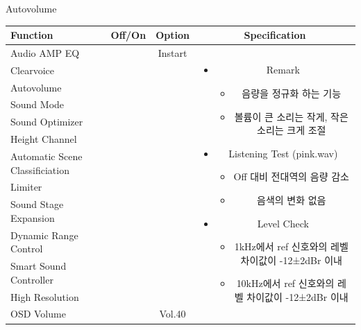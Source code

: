 \documentclass{beamer}
\begin{document}
\begin{frame}[t]{Autovolume}
\begin{tiny}
\begin{tabular}{@{}lccc@{}}
\toprule
Function & Off/On & Option & Specification \\
\midrule
Audio AMP EQ & \color{black}{Off} & Instart &
\multirow{13}{60mm}{
\begin{itemize}
\item Remark
	\begin{itemize}
	\item 음량을 정규화 하는 기능
	\item 볼륨이 큰 소리는 작게, 작은 소리는 크게 조절
	\end{itemize}
\item Listening Test (pink.wav)
	\begin{itemize}
	\item Off 대비 전대역의 음량 감소
	\item 음색의 변화 없음
	\end{itemize}
\item Level Check
  \begin{itemize}
  \item 1kHz에서 ref 신호와의 레벨 차이값이 -12±2dBr 이내
  \item 10kHz에서 ref 신호와의 레벨 차이값이 -12±2dBr 이내
  \end{itemize}
\end{itemize}
} \\
Clearvoice & \color{black}{Off} & & \\
Autovolume & \color{blue}{On} & & \\
Sound Mode & \color{black}{Off} & & \\
Sound Optimizer & \color{black}{Off} & & \\
Height Channel & \color{black}{Off} & & \\
Automatic Scene Classificiation & \color{black}{Off} & & \\
Limiter & \color{black}{Off} & & \\
Sound Stage Expansion & \color{black}{Off} & & \\
Dynamic Range Control & \color{black}{Off} & & \\
Smart Sound Controller & \color{black}{Off} & & \\
High Resolution & \color{black}{Off} & & \\
OSD Volume & \color{blue}{On} & Vol.40 & \\
\midrule
\end{tabular}
\end{tiny}

\end{frame}
\end{document}
